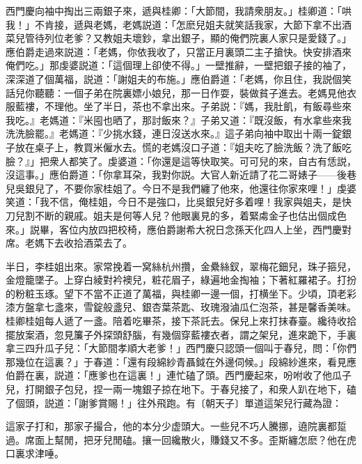 西門慶向袖中掏出三兩銀子來，遞與桂卿：「大節間，我請衆朋友。」桂卿道：「哄我！」不肯接，遞與老媽，老媽説道：「怎麽兒姐夫就笑話我家，大節下拿不出酒菜兒管待列位老爹？又教姐夫壞鈔，拿出銀子，顯的俺們院裏人家只是愛錢了。」應伯爵走過來説道：「老媽，你依我收了，只當正月裏頭二主子搶快。快安排酒來俺們吃。」那虔婆説道：「這個理上卻使不得。」一壁推辭，一壁把銀子接的袖了，深深道了個萬福，説道：「謝姐夫的布施。」應伯爵道：「老媽，你且住，我説個笑話兒你聽聽：一個子弟在院裏嫖小娘兒，那一日作耍，裝做貧子進去。老媽見他衣服藍褸，不理他。坐了半日，茶也不拿出來。子弟説：『媽，我肚飢，有飯尋些來我吃。』老媽道：『米囤也晒了，那討飯來？』子弟又道：『既沒飯，有水拿些來我洗洗臉罷。』老媽道：『少挑水錢，連日沒送水來。』這子弟向袖中取出十兩一錠銀子放在桌子上，教買米僱水去。慌的老媽沒口子道：『姐夫吃了臉洗飯？洗了飯吃臉？』」把衆人都笑了。虔婆道：「你還是這等快取笑。可可兒的來，自古有恁説，沒這事。」應伯爵道：「你拿耳朶，我對你説。大官人新近請了花二哥婊子——後巷兒吳銀兒了，不要你家桂姐了。今日不是我們纏了他來，他還往你家來哩！」虔婆笑道：「我不信，俺桂姐，今日不是強口，比吳銀兒好多着哩！我家與姐夫，是快刀兒割不断的親戚。姐夫是何等人兒？他眼裏見的多，着緊䖏金子也估出個成色來。」説畢，客位内放四把校椅，應伯爵謝希大祝日念孫天化四人上坐，西門慶對席。老媽下去收拾酒菜去了。

半日，李桂姐出來。家常挽着一窝絲杭州攢，金纍絲釵，翠梅花鈿兒，珠子箍兒，金燈籠墜子。上穿白綾對衿襖兒，粧花眉子，綠遍地金掏袖；下著紅羅裙子。打扮的粉粧玉琢。望下不當不正道了萬福，與桂卿一邊一個，打横坐下。少頃，頂老彩漆方盤拿七盞來，雪錠般盞兒、銀杏葉茶匙、玫瑰潑滷瓜仁泡茶，甚是馨香美味。桂卿桂姐每人遞了一盞。陪着吃畢茶，接下茶託去。保兒上來打抹春臺。纔待收拾擺放案酒，忽見簾子外探頭舒腦，有幾個穿藍褸衣者，謂之架兒，進來跪下，手裏拿三四升瓜子兒：「大節間孝順大老爹！」西門慶只認頭一個叫于春兒，問：「你們那幾位在這裏？」于春道：「還有段綿紗青聶鉞在外邊伺候。」段綿紗進來，看見應伯爵在裏，説道：「應爹也在這裏！」連忙磕了頭。西門慶起來，吩咐收了他瓜子兒，打開銀子包兒，捏一兩一塊銀子掠在地下。于春兒接了，和衆人趴在地下，磕了個頭，説道：「謝爹賞賜！」往外飛跑。有〔朝天子〕單道這架兒行藏為證：

\begin{myquote}
這家子打和，那家子撮合，他的本分少虚頭大。一些兒不巧人騰挪，遶院裏都踅過。席面上幫閒，把牙兒閒磕。攘一回纔散火，賺錢又不多。歪斯纏怎麽？他在虎口裏求津唾。
\end{myquote}


